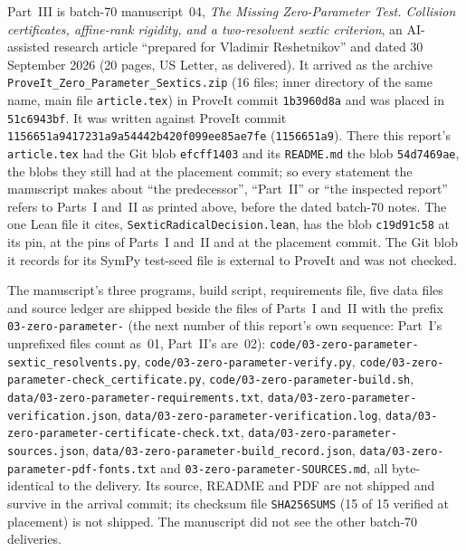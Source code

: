 \documentclass[11pt,letterpaper]{article}
\numberwithin{equation}{section}
\theoremstyle{definition}
\theoremstyle{remark}
\newcommand{\src}[1]{\texttt{\nolinkurl{#1}}}
\newcommand{\zptpin}{\texttt{1156651a9417231a9a54442b420f099ee85ae7fe}}
\begin{document}
Part~III is batch-70 manuscript~04, \emph{The Missing Zero-Parameter Test.
Collision certificates, affine-rank rigidity, and a two-resolvent sextic
criterion}, an AI-assisted research article ``prepared for Vladimir
Reshetnikov'' and dated 30 September 2026 (20 pages, US Letter, as
delivered). It arrived as the archive
\src{ProveIt_Zero_Parameter_Sextics.zip} (16 files; inner directory of the
same name, main file \src{article.tex}) in ProveIt commit \src{1b3960d8a}
and was placed in \src{51c6943bf}. It was written against ProveIt commit
\zptpin{} (\src{1156651a9}). There this report's \src{article.tex} had the
Git blob \src{efcff1403} and its \src{README.md} the blob \src{54d7469ae},
the blobs they still had at the placement commit; so every statement the
manuscript makes about ``the predecessor'', ``Part~II'' or ``the inspected
report'' refers to Parts~I and~II as printed above, before the dated
batch-70 notes. The one Lean file it cites, \src{SexticRadicalDecision.lean},
has the blob \src{c19d91c58} at its pin, at the pins of Parts~I and~II and at
the placement commit. The Git blob it records for its SymPy test-seed file is
external to ProveIt and was not checked.

The manuscript's three programs, build script, requirements file, five data
files and source ledger are shipped beside the files of Parts~I and~II with
the prefix \src{03-zero-parameter-} (the next number of this report's own
sequence: Part~I's unprefixed files count as~01, Part~II's are~02):
\src{code/03-zero-parameter-sextic_resolvents.py},
\src{code/03-zero-parameter-verify.py},
\src{code/03-zero-parameter-check_certificate.py},
\src{code/03-zero-parameter-build.sh},
\src{data/03-zero-parameter-requirements.txt},
\src{data/03-zero-parameter-verification.json},
\src{data/03-zero-parameter-verification.log},
\src{data/03-zero-parameter-certificate-check.txt},
\src{data/03-zero-parameter-sources.json},
\src{data/03-zero-parameter-build_record.json},
\src{data/03-zero-parameter-pdf-fonts.txt} and
\src{03-zero-parameter-SOURCES.md}, all byte-identical to the delivery.
Its source, README and PDF are not shipped and survive in the arrival
commit; its checksum file \src{SHA256SUMS} (15 of 15 verified at placement)
is not shipped. The manuscript did not see the other batch-70 deliveries.
\end{document}
